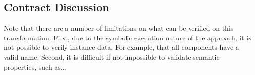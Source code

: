 \subsection{Contract Discussion}

Note that there are a number of limitations on what can be verified on this transformation. First, due to the symbolic execution nature of the approach, it is not possible to verify instance data. For example, that all components have a valid name. Second, it is difficult if not impossible to validate semantic properties, such as...




















